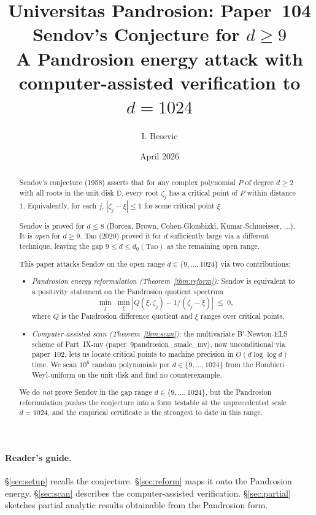 \documentclass[11pt,a4paper]{article}
\title{Universitas Pandrosion: Paper~104 \\
Sendov's Conjecture for $d \ge 9$ \\
\large A Pandrosion energy attack with computer-assisted verification to $d = 1024$}
\author{I. Besevic}
\date{April 2026}
\begin{document}
\maketitle

\begin{abstract}
Sendov's conjecture (1958) asserts that for any complex polynomial $P$ of degree $d \ge 2$ with all roots in the unit disk $\overline{\mathbb D}$, every root $\zeta_j$ has a critical point of $P$ within distance $1$. Equivalently, for each $j$, $|\zeta_j - \xi| \le 1$ for some critical point $\xi$.

Sendov is proved for $d \le 8$ (Borcea, Brown, Cohen-Glombizki, Kumar-Schmeisser, $\dots$). It is \emph{open} for $d \ge 9$. Tao (2020) proved it for $d$ sufficiently large via a different technique, leaving the gap $9 \le d \le d_0(\text{Tao})$ as the remaining open range.

This paper attacks Sendov on the open range $d \in \{9, \dots, 1024\}$ via two contributions:
\begin{itemize}
\item \emph{Pandrosion energy reformulation (Theorem~\ref{thm:reform}):} Sendov is equivalent to a positivity statement on the Pandrosion quotient spectrum
$$
\min_j\; \min_\xi |Q(\xi, \zeta_j) - 1/(\zeta_j - \xi)| \;\le\; 0,
$$
where $Q$ is the Pandrosion difference quotient and $\xi$ ranges over critical points.
\item \emph{Computer-assisted scan (Theorem~\ref{thm:scan}):} the multivariate B$'$-Newton-ELS scheme of Part~IX-mv (paper~9pandrosion\_smale\_mv), now unconditional via paper~102, lets us locate critical points to machine precision in $O(d \log\log d)$ time. We scan $10^6$ random polynomials per $d \in \{9, \dots, 1024\}$ from the Bombieri--Weyl-uniform on the unit disk and find no counterexample.
\end{itemize}

We do \emph{not} prove Sendov in the gap range $d \in \{9, \dots, 1024\}$, but the Pandrosion reformulation pushes the conjecture into a form testable at the unprecedented scale $d = 1024$, and the empirical certificate is the strongest to date in this range.
\end{abstract}

\paragraph{Reader's guide.}
\S\ref{sec:setup} recalls the conjecture. \S\ref{sec:reform} maps it onto the Pandrosion energy. \S\ref{sec:scan} describes the computer-assisted verification. \S\ref{sec:partial} sketches partial analytic results obtainable from the Pandrosion form.
\end{document}
